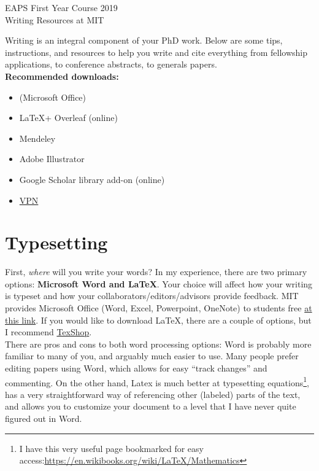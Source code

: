 \documentclass{article}
\begin{document}
\begin{center}
{\LARGE EAPS First Year Course 2019}\\
\vspace{10pt}
{\Large Writing Resources at MIT}\\
\vspace{6pt}
\end{center}
Writing is an integral component of your PhD work. Below are some tips, instructions, and resources to help you write and cite everything from fellowship applications, to conference abstracts, to generals papers.\\

    \textbf{Recommended downloads:}
    \begin{itemize}
        \item (Microsoft Office)
        \item \LaTeX + Overleaf (online)
        \item Mendeley
        \item Adobe Illustrator
        \item Google Scholar library add-on (online)
        \item \href{https://ist.mit.edu/cisco-anyconnect}{VPN}
    \end{itemize}

\section*{Typesetting}
First, \emph{where} will you write your words? In my experience, there are two primary options:
\textbf{Microsoft Word and \LaTeX}.
Your choice will affect how your writing is typeset and how your collaborators/editors/advisors provide feedback. MIT provides Microsoft Office (Word, Excel, Powerpoint, OneNote) to students free \href{https://ist.mit.edu/office/license}{at this link}. If you would like to download \LaTeX, there are a couple of options, but I recommend \href{https://pages.uoregon.edu/koch/texshop/}{TexShop}.\\

There are pros and cons to both word processing options: Word is probably more familiar to many of you, and arguably much easier to use. Many people prefer editing papers using Word, which allows for easy ``track changes'' and commenting. On the other hand, Latex is much better at typesetting equations\footnote{I have this very useful page bookmarked for easy access:\href{ https://en.wikibooks.org/wiki/LaTeX/Mathematics}{https://en.wikibooks.org/wiki/LaTeX/Mathematics}}, has a very straightforward way of referencing other (labeled) parts of the text, and allows you to customize your document to a level that I have never quite figured out in Word. 
\end{document}
